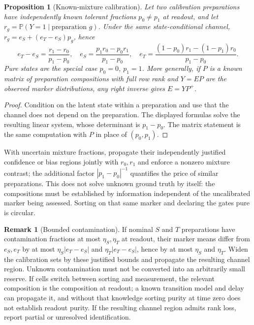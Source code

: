\documentclass[11pt]{article}
\newtheorem{proposition}[theorem]{Proposition}
\theoremstyle{definition}
\newtheorem{remark}[theorem]{Remark}
\newcommand{\Prob}{\mathbb P}
\begin{document}
\begin{proposition}[Known-mixture calibration]\label{prop:mixcal}
Let two calibration preparations have independently known tolerant fractions
$p_0\ne p_1$ \emph{at readout}, and let $r_g=\Prob(Y=1\mid\text{preparation }g)$.
Under the same state-conditional channel, $r_g=e_S+(e_T-e_S)p_g$, hence
\begin{equation}\label{eq:S2}
 e_T-e_S=\frac{r_1-r_0}{p_1-p_0},\quad
 e_S=\frac{p_1r_0-p_0r_1}{p_1-p_0},\quad
 e_T=\frac{(1-p_0)r_1-(1-p_1)r_0}{p_1-p_0}.
\end{equation}
Pure states are the special case $p_0=0$, $p_1=1$. More generally, if $P$ is a
known matrix of preparation compositions with full row rank and $Y=EP$ are the
observed marker distributions, any right inverse gives $E=YP^{+}$.
\end{proposition}
\begin{proof}
Condition on the latent state within a preparation and use that the channel does
not depend on the preparation. The displayed formulas solve the resulting linear
system, whose determinant is $p_1-p_0$. The matrix statement is the same
computation with $P$ in place of $(p_0,p_1)$.
\end{proof}

With uncertain mixture fractions, propagate their independently justified
confidence or bias regions jointly with $r_0,r_1$ and enforce a nonzero mixture
contrast; the additional factor $|p_1-p_0|^{-1}$ quantifies the price of similar
preparations. This does not solve unknown ground truth by itself: the
compositions must be established by information independent of the uncalibrated
marker being assessed. Sorting on that same marker and declaring the gates pure
is circular.

\begin{remark}[Bounded contamination]\label{rem:contam}
If nominal $S$ and $T$ preparations have contamination fractions at most
$\eta_S,\eta_T$ at readout, their marker means differ from $e_S,e_T$ by at most
$\eta_S|e_T-e_S|$ and $\eta_T|e_T-e_S|$, hence by at most $\eta_S$ and $\eta_T$.
Widen the calibration sets by these justified bounds and propagate the resulting
channel region. Unknown contamination must not be converted into an arbitrarily
small reserve. If cells switch between sorting and measurement, the relevant
composition is the composition at readout; a known transition model and delay
can propagate it, and without that knowledge sorting purity at time zero does not
establish readout purity. If the resulting channel region admits rank loss,
report partial or unresolved identification.
\end{remark}
\end{document}
